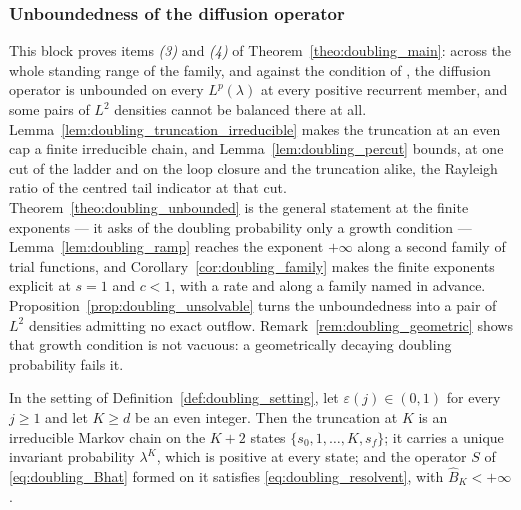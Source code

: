 \subsubsection{Unboundedness of the diffusion operator}

This block proves items \emph{(3)} and \emph{(4)} of Theorem~\ref{theo:doubling_main}: across
the whole standing range of the family, and against the condition of
\citet{morozov2025revisiting}, the diffusion operator is unbounded on every $L^p(\lambda)$ at
every positive recurrent member, and some pairs of $L^2$ densities cannot be balanced there at
all. Lemma~\ref{lem:doubling_truncation_irreducible} makes the truncation at an even cap a
finite irreducible chain, and Lemma~\ref{lem:doubling_percut} bounds, at one cut of the ladder
and on the loop closure and the truncation alike, the Rayleigh ratio of the centred tail
indicator at that cut. Theorem~\ref{theo:doubling_unbounded} is the general statement at the
finite exponents --- it asks of the doubling probability only a growth condition ---
Lemma~\ref{lem:doubling_ramp} reaches the exponent $+\infty$ along a second family of trial
functions, and Corollary~\ref{cor:doubling_family} makes the finite exponents explicit at
$s=1$ and $c<1$, with a rate and along a family named in advance.
Proposition~\ref{prop:doubling_unsolvable} turns the unboundedness into a pair of $L^2$
densities admitting no exact outflow. Remark~\ref{rem:doubling_geometric} shows that growth
condition is not vacuous: a geometrically decaying doubling probability fails it.

\begin{lemma}\label{lem:doubling_truncation_irreducible}
In the setting of Definition~\ref{def:doubling_setting}, let $\varepsilon(j)\in(0,1)$ for every
$j\geq1$ and let $K\geq d$ be an even integer. Then the truncation at $K$ is an irreducible
Markov chain on the $K+2$ states $\{s_0,1,\dots,K,s_f\}$; it carries a unique invariant
probability $\lambda^K$, which is positive at every state; and the operator $S$ of
\eqref{eq:doubling_Bhat} formed on it satisfies \eqref{eq:doubling_resolvent}, with
$\widehat B_K<+\infty$.
\end{lemma}


